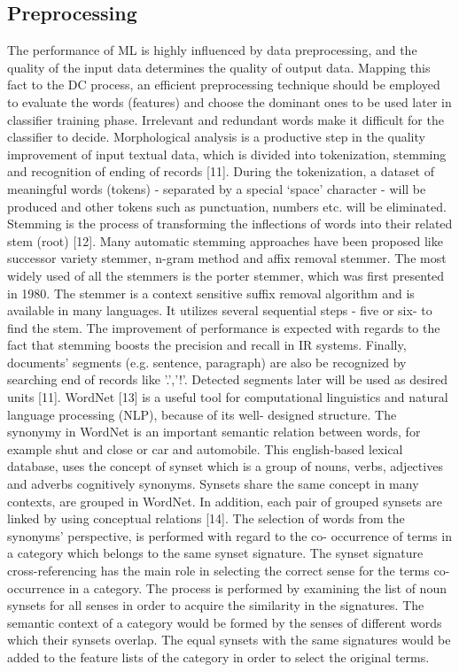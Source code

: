 \documentclass{sigchi}
\begin{document}
\subsection{Preprocessing}\label{sectionPreprocessing}
The performance of ML is highly influenced by data
preprocessing, and the quality of the input data determines the
quality of output data. Mapping this fact to the DC process, an
efficient preprocessing technique should be employed to
evaluate the words (features) and choose the dominant ones to
be used later in classifier training phase. Irrelevant and
redundant words make it difficult for the classifier to decide.
Morphological analysis is a productive step in the quality
improvement of input textual data, which is divided into
tokenization, stemming and recognition of ending of records
[11]. During the tokenization, a dataset of meaningful words
(tokens) - separated by a special ‘space’ character - will be
produced and other tokens such as punctuation, numbers etc.
will be eliminated. Stemming is the process of transforming
the inflections of words into their related stem (root) [12].
Many automatic stemming approaches have been proposed
like successor variety stemmer, n-gram method and affix
removal stemmer. The most widely used of all the stemmers
is the porter stemmer, which was first presented in 1980. The
stemmer is a context sensitive suffix removal algorithm and is
available in many languages. It utilizes several sequential
steps - five or six- to find the stem. The improvement of
performance is expected with regards to the fact that
stemming boosts the precision and recall in IR systems.
Finally, documents' segments (e.g. sentence, paragraph) are
also be recognized by searching end of records like '.','!'.
Detected segments later will be used as desired units [11].
WordNet [13] is a useful tool for computational linguistics
and natural language processing (NLP), because of its well-
designed structure. The synonymy in WordNet is an important
semantic relation between words, for example shut and close
or car and automobile. This english-based lexical database,
uses the concept of synset which is a group of nouns, verbs,
adjectives and adverbs cognitively synonyms. Synsets share
the same concept in many contexts, are grouped in WordNet.
In addition, each pair of grouped synsets are linked by using
conceptual relations [14]. The selection of words from the
synonyms’ perspective, is performed with regard to the co-
occurrence of terms in a category which belongs to the same
synset signature. The synset signature cross-referencing has
the main role in selecting the correct sense for the terms co-
occurrence in a category. The process is performed by
examining the list of noun synsets for all senses in order to
acquire the similarity in the signatures. The semantic context
of a category would be formed by the senses of different
words which their synsets overlap. The equal synsets with the
same signatures would be added to the feature lists of the
category in order to select the original terms.
\end{document}
